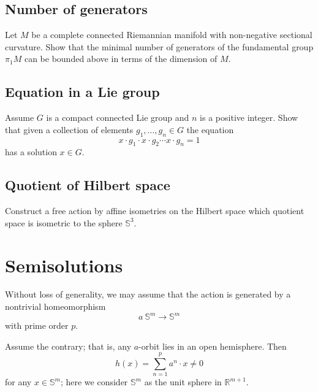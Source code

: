 \subsection*{Number of generators}\label{Number of generators}

\begin{pr}
Let $M$ be a complete connected Riemannian manifold with non-negative sectional curvature.
Show that the minimal number of generators of the fundamental group $\pi_1 M$
can be bounded above in terms of the dimension of $M$.
\end{pr}


\subsection*{Equation in a Lie group\easy}\label{Equations in the group}

\begin{pr}
Assume $G$ is a compact connected Lie group and $n$ is a positive integer.
Show that given a collection of elements $g_1,\dots,g_n\in G$
the equation 
\[x\cdot g_1\cdot x\cdot g_2\cdots x\cdot g_n=1\]
has a solution $x\in G$.
\end{pr}

\subsection*{Quotient of Hilbert space\hard}\label{Quotient of Hilbert space}

\begin{pr}
Construct a free action by affine isometries on the Hilbert space which quotient space is isometric to the sphere $\mathbb{S}^3$.
\end{pr}

\section*{Semisolutions}
Without loss of generality, we may assume that the action is generated by a nontrivial homeomorphism 
\[a\:\mathbb{S}^m\to\mathbb{S}^m\] 
with prime order $p$.

Assume the contrary; that is, any $a$-orbit lies in an open hemisphere.
Then 
\[h(x)=\sum_{n=1}^p a^n\cdot x\ne0\]
for any $x\in\mathbb{S}^m$; here we consider $\mathbb{S}^m$ as the unit sphere in $\mathbb{R}^{m+1}$.

